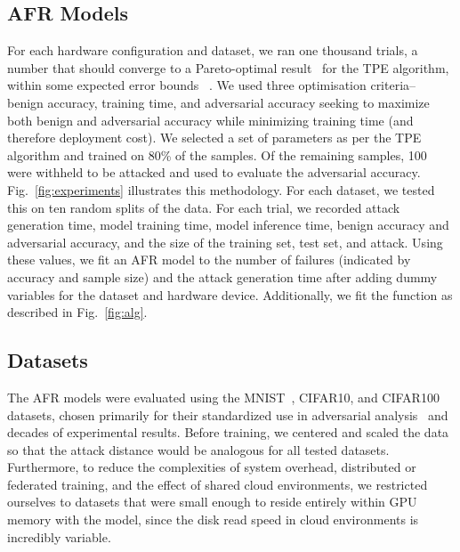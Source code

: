 \documentclass[conference]{IEEEtran}
\begin{document}
\subsection{AFR Models}

For each hardware configuration and dataset, we ran one thousand trials, a number that should converge to a Pareto-optimal result~\cite{ozaki2020multiobjective,zitzler2008quality} for the TPE algorithm, within some expected error bounds ~\cite{legriel2010approximating}. We used three optimisation criteria-- benign accuracy, training time, and adversarial accuracy seeking to maximize both benign and adversarial accuracy while minimizing training time (and therefore deployment cost). We selected a set of parameters as per the TPE algorithm and trained on 80\% of the samples. Of the remaining samples, 100 were withheld to be attacked and used to evaluate the adversarial accuracy. Fig.~\ref{fig:experiments} illustrates this methodology. For each dataset, we tested this on ten random splits of the data. For each trial, we recorded attack generation time, model training time, model inference time, benign accuracy and adversarial accuracy, and the size of the training set, test set, and attack. Using these values, we fit an AFR model to the number of failures (indicated by accuracy and sample size) and the attack generation time after adding dummy variables for the dataset and hardware device. Additionally, we fit the function as described in Fig.~\ref{fig:alg}.

\subsection{Datasets}
The AFR models were evaluated using the MNIST~\cite{mnist}, CIFAR10\cite{cifar}, and CIFAR100\cite{cifar} datasets, chosen primarily for their standardized use in adversarial analysis~\cite{madry2017towards,croce_reliable_2020,carlini_towards_2017,deepfool} and decades of experimental results.
Before training, we centered and scaled the data so that the attack distance would be analogous for all tested datasets. Furthermore, to reduce the complexities of system overhead, distributed or federated training, and the effect of shared cloud environments, we restricted ourselves to datasets that were small enough to reside entirely within GPU memory with the model, since the disk read speed in cloud environments is incredibly variable.
\end{document}

